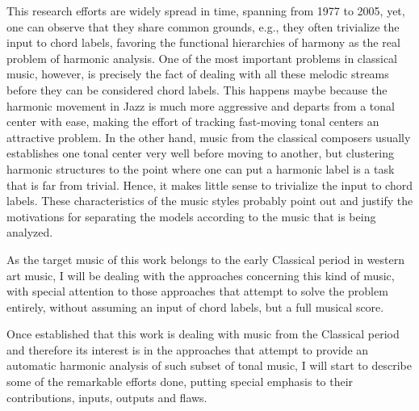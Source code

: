  This research efforts are widely spread in time, spanning from 1977 to 2005, yet, one can observe that they share common grounds, e.g., they often trivialize the input to chord labels, favoring the functional hierarchies of harmony as the real problem of harmonic analysis. One of the most important problems in classical music, however, is precisely the fact of dealing with all these melodic streams before they can be considered chord labels. This happens maybe because the harmonic movement in Jazz is much more aggressive and departs from a tonal center with ease, making the effort of tracking fast-moving tonal centers an attractive problem. In the other hand, music from the classical composers usually establishes one tonal center very well before moving to another, but clustering harmonic structures to the point where one can put a harmonic label is a task that is far from trivial. Hence, it makes little sense to trivialize the input to chord labels. These characteristics of the music styles probably point out and justify the motivations for separating the models according to the music that is being analyzed.

 As the target music of this work belongs to the early Classical period in western art music, I will be dealing with the approaches concerning this kind of music, with special attention to those approaches that attempt to solve the problem entirely, without assuming an input of chord labels, but a full musical score.

 Once established that this work is dealing with music from the Classical period and therefore its interest is in the approaches that attempt to provide an automatic harmonic analysis of such subset of tonal music, I will start to describe some of the remarkable efforts done, putting special emphasis to their contributions, inputs, outputs and flaws.


\newpage
